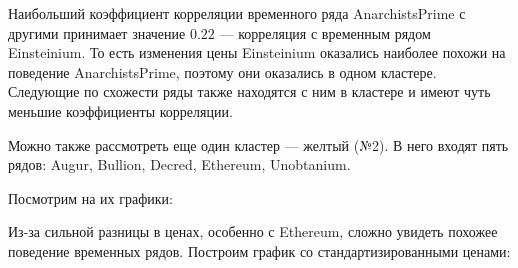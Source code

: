 Наибольший коэффициент корреляции временного ряда AnarchistsPrime с другими принимает значение $0.22$ --- корреляция с временным рядом Einsteinium. То есть изменения цены Einsteinium оказались наиболее похожи на поведение AnarchistsPrime, поэтому они оказались в одном кластере. Следующие по схожести ряды также находятся с ним в кластере и имеют чуть меньшие коэффициенты корреляции.
\newpage
\begin{multicols}{2}
	
	Можно также рассмотреть еще один кластер --- желтый (№2). В него входят пять рядов: Augur, Bullion, Decred, Ethereum, Unobtanium.
\end{multicols}

Посмотрим на их графики:

\begin{figure}[H]
	\noindent {}
\end{figure}

Из-за сильной разницы в ценах, особенно с Ethereum, сложно увидеть похожее поведение временных рядов. Построим график со стандартизированными ценами:


